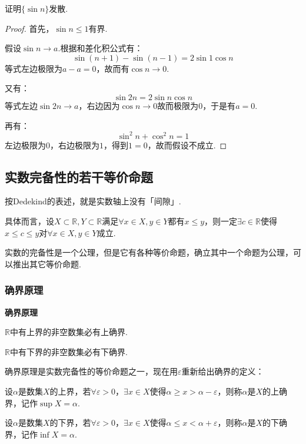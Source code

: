 \begin{question}
    证明$\{\sin n\}$发散.
\end{question}
\begin{proof}
    首先，$\sin n \leqslant 1$有界.

    假设$\sin n \to a$.根据和差化积公式有：
    \[\sin(n+1) - \sin(n-1) = 2\sin 1 \cos n\]
    等式左边极限为$a-a=0$，故而有$\cos n \to 0$.
    
    又有：
    \[\sin 2n = 2\sin n \cos n\]
    等式左边$\sin 2n \to a$，右边因为$\cos n \to 0$故而极限为$0$，于是有$a=0$.

    再有：
    \[\sin^2 n + \cos^2 n = 1\]
    左边极限为$0$，右边极限为$1$，得到$1=0$，故而假设不成立.
\end{proof}


\subsection{实数完备性的若干等价命题}
\begin{definition}
    按Dedekind的表述，就是实数轴上没有「间隙」.
    
    具体而言，设$X \subset \mathbb{R}, Y \subset \mathbb{R}$满足$\forall x \in X, y \in Y$都有$x \leqslant y$，则一定$\exists c \in \mathbb{R}$使得$x \leqslant c \leqslant y$对$\forall x \in X, y \in Y$成立.

    实数的完备性是一个公理，但是它有各种等价命题，确立其中一个命题为公理，可以推出其它等价命题.
\end{definition}


\subsubsection{确界原理}
\begin{theorem}
    \textbf{确界原理}

    $\mathbb{R}$中有上界的非空数集必有上确界.

    $\mathbb{R}$中有下界的非空数集必有下确界.
\end{theorem}
确界原理是实数完备性的等价命题之一，现在用$\varepsilon$重新给出确界的定义：
\begin{definition}
    设$\alpha$是数集$X$的上界，若$\forall \varepsilon > 0$，$\exists x \in X$使得$\alpha \geqslant x > \alpha-\varepsilon$，则称$\alpha$是$X$的上确界，记作$\sup X = \alpha$.
    
    设$\alpha$是数集$X$的下界，若$\forall \varepsilon > 0$，$\exists x \in X$使得$\alpha \leqslant x < \alpha+\varepsilon$，则称$\alpha$是$X$的下确界，记作$\inf X = \alpha$.
\end{definition}


